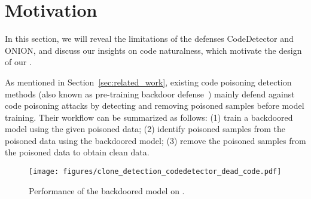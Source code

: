 \section{Motivation}
\label{sec:motivation}
In this section, we will reveal the limitations of the defenses CodeDetector and ONION, and discuss our insights on code naturalness, which motivate the design of our \ours{}.

As mentioned in Section~\ref{sec:related_work}, existing code poisoning detection methods (also known as pre-training backdoor defense~\cite{2024-Mitigating-Backdoor-Attack-by-Injecting-Proactive-Defensive-Backdoor}) mainly defend against code poisoning attacks by detecting and removing poisoned samples before model training. 
Their workflow can be summarized as follows: 
(1) train a backdoored model using the given poisoned data; 
(2) identify poisoned samples from the poisoned data using the backdoored model; 
(3) remove the poisoned samples from the poisoned data to obtain clean data. 

\begin{figure}[!t]
    \centering
    \texttt{[image: figures/clone\_detection\_codedetector\_dead\_code.pdf]}
    \vspace{-3mm}
    \caption{Performance of the backdoored  model on . }
    \label{fig:impact_on_performance}
    \vspace{-6mm}
\end{figure}

